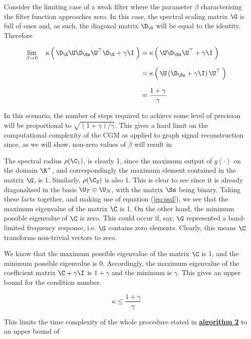 Consider the limiting case of a weak filter where the parameter $\beta$ characterising the filter function approaches zero. In this case, the spectral scaling matrix $\G$ is full of ones and, as such, the diagonal matrix $\D_\G$ will be equal to the identity. Therefore 

\begin{align}
    \lim_{\beta \rightarrow 0} \quad \kappa \left(  \, \D_\G \U \D_{\Ss} \U^\top \D_\G + \gamma \I \; \right) &= \kappa  \left(  \, \U \D_{\Ss} \U^\top + \gamma \I \; \right) \notag \\[0.2cm]
    &= \kappa  \left(  \, \U \left( \D_{\Ss} + \gamma \I \right) \U^\top \; \right) \notag \\[0.3cm]
    &= \frac{1 + \gamma}{\gamma}
\end{align}

In this scenario, the number of steps required to achieve some level of precision will be proportional to $\sqrt{(1 + \gamma) / \gamma}$. This gives a hard limit on the computational complexity of the CGM as applied to graph signal reconstruction since, as we will show, non-zero values of $\beta$ will result in 



The spectral radius $\rho(\C_1)$, is clearly 1, since the maximum output of $g(\cdot)$ on the domain $\R^{+}$, and correspondingly the maximum element contained in the matrix $\G$, is 1. Similarly, $\rho(\C_2)$ is also 1. This is clear to see since it is already diagonalised in the basis $\U_T \otimes \U_N$, with the matrix $\Ss$ being binary.  Taking these facts together, and making use of equation (\ref{eq:psd}), we see that the maximum eigenvalue of the matrix $\C$ is 1. On the other hand, the minimum possible eigenvalue of $\C$ is zero. This could occur if, say, $\G$ represented a band-limited frequency response, i.e. $\G$ contains zero elements. Clearly, this means $\C$ transforms non-trivial vectors to zero.

We know that the maximum possible eigenvalue of the matrix $\C$ is 1, and the minimum possible eigenvalue is $0$. Accordingly, the maximum eigenvalue of the coefficient matrix $\C + \gamma \I$ is $1 + \gamma$ and the minimum is $\gamma$. This gives an upper bound for the condition number.

\begin{equation}
    \kappa \leq \frac{1 + \gamma}{\gamma}
\end{equation}

This limits the time complexity of the whole procedure stated in \hyperlink{al2}{\textbf{algorithm 2}} to an upper bound of

